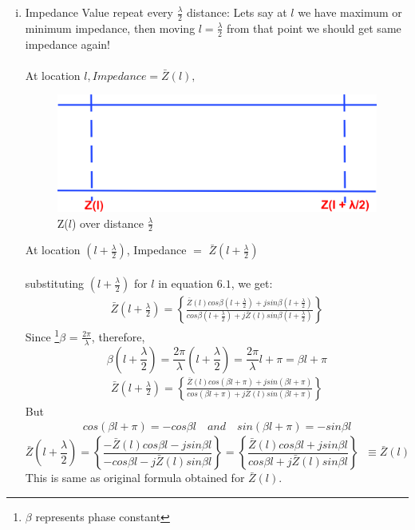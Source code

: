 \begin{enumerate}[(i)]
\item Impedance Value repeat every $\frac{\lambda}{2}$ distance: Lets say at $l$ we have maximum or minimum impedance, then moving $l=\frac{\lambda}{2}$ from that point we should get same impedance again!\\\\
At location $l , Impedance =\bar{Z}(l),$
\begin{figure}[h]
\centering
\includegraphics[width=0.7\linewidth]{./graphics/astyui;f}
\caption{Z($l$) over distance $\frac{\lambda}{2}$}
\label{fig:astyuif}
\end{figure}

At location ${(l+\frac{\lambda}{2})}$, Impedance  $=$ $\bar{Z}(l+\frac{\lambda}{2})$\\\\
substituting ${(l+\frac{\lambda}{2})}$ for $l$ in equation $6.1$, we get: 
\begin{align*}
\bar{Z}(l+\frac{\lambda}{2}) = \left\lbrace \frac{\bar{Z}(l)cos\beta (l+\frac{\lambda}{2}) + jsin\beta (l+\frac{\lambda}{2})}{cos\beta (l+\frac{\lambda}{2}) + j\bar{Z}(l)sin\beta (l+\frac{\lambda}{2})}\right\rbrace 
\end{align*}
Since \footnote{$\beta$ represents phase constant}$\beta$ = $ \frac{2\pi}{\lambda}$, therefore,
\begin{dmath*}
\beta(l+\frac{\lambda}{2})=\frac{2\pi}{\lambda}(l+\frac{\lambda}{2})=\frac{2\pi}{\lambda}l+\pi=\beta l+\pi
\end{dmath*}
\begin{align*}
\bar{Z}(l+\frac{\lambda}{2}) = \left\lbrace \frac{\bar{Z}(l)cos(\beta l+\pi) + jsin(\beta l+\pi)}{cos(\beta l+\pi) + j\bar{Z}(l)sin(\beta l+\pi)}\right\rbrace 
\end{align*}
But 
\begin{align*} 
cos(\beta l+\pi)=-cos\beta l \quad and \quad sin(\beta l+\pi)=-sin\beta l
\end{align*}
\begin{dmath*}
\bar{Z}(l+\frac{\lambda}{2})=\left\lbrace \frac{-\bar{Z}(l)cos\beta l - jsin\beta l}{-cos\beta l - j\bar{Z}(l)sin\beta l}\right\rbrace = \left\lbrace \frac{\bar{Z}(l)cos\beta l + jsin\beta l}{cos\beta l + j\bar{Z}(l)sin\beta l}\right\rbrace\;\;\equiv \bar{Z}(l)
\end{dmath*} 
This is same as original formula obtained for $\bar{Z}(l)$.


\end{enumerate}
